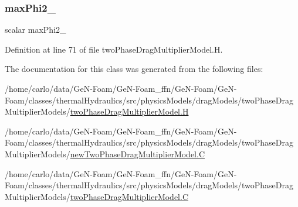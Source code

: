 \mbox{\label{classFoam_1_1twoPhaseDragMultiplierModel_a7b64d94c8ee5e650272a6d9e2d95e394}} 
\subsubsection{\texorpdfstring{max\+Phi2\+\_\+}{maxPhi2\_}}
{\footnotesize\ttfamily scalar max\+Phi2\+\_\+\hspace{0.3cm}{\ttfamily [protected]}}



Definition at line 71 of file two\+Phase\+Drag\+Multiplier\+Model.\+H.



The documentation for this class was generated from the following files\+:\begin{DoxyCompactItemize}
\item 
/home/carlo/data/\+Ge\+N-\/\+Foam/\+Ge\+N-\/\+Foam\+\_\+ffn/\+Ge\+N-\/\+Foam/\+Ge\+N-\/\+Foam/classes/thermal\+Hydraulics/src/physics\+Models/drag\+Models/two\+Phase\+Drag\+Multiplier\+Models/\hyperlink{twoPhaseDragMultiplierModel_8H}{two\+Phase\+Drag\+Multiplier\+Model.\+H}\item 
/home/carlo/data/\+Ge\+N-\/\+Foam/\+Ge\+N-\/\+Foam\+\_\+ffn/\+Ge\+N-\/\+Foam/\+Ge\+N-\/\+Foam/classes/thermal\+Hydraulics/src/physics\+Models/drag\+Models/two\+Phase\+Drag\+Multiplier\+Models/\hyperlink{newTwoPhaseDragMultiplierModel_8C}{new\+Two\+Phase\+Drag\+Multiplier\+Model.\+C}\item 
/home/carlo/data/\+Ge\+N-\/\+Foam/\+Ge\+N-\/\+Foam\+\_\+ffn/\+Ge\+N-\/\+Foam/\+Ge\+N-\/\+Foam/classes/thermal\+Hydraulics/src/physics\+Models/drag\+Models/two\+Phase\+Drag\+Multiplier\+Models/\hyperlink{twoPhaseDragMultiplierModel_8C}{two\+Phase\+Drag\+Multiplier\+Model.\+C}\end{DoxyCompactItemize}
